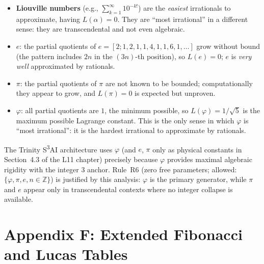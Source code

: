 \begin{itemize}
  \item
    \textbf{Liouville numbers} (e.g.,
    $\sum_{k=1}^{\infty} 10^{-k!}$) are the
    \emph{easiest} irrationals to approximate,
    having $L(\alpha) = 0$.
    They are ``most irrational'' in a different
    sense: they are transcendental and not even
    algebraic.
  \item
    \textbf{$e$}: the partial quotients of
    $e = [2; 1, 2, 1, 1, 4, 1, 1, 6, 1, \ldots]$
    grow without bound (the pattern includes $2n$
    in the $(3n)$-th position), so $L(e) = 0$;
    $e$ is \emph{very well} approximated by rationals.
  \item
    \textbf{$\pi$}: the partial quotients of $\pi$
    are not known to be bounded; computationally they
    appear to grow, and $L(\pi) = 0$ is expected
    but unproven.
  \item
    \textbf{$\varphi$}: all partial quotients are $1$,
    the minimum possible, so $L(\varphi) = 1/\sqrt{5}$
    is the maximum possible Lagrange constant.
    This is the only sense in which $\varphi$ is
    ``most irrational'': it is the hardest irrational
    to approximate by rationals.
\end{itemize}

The Trinity S\textsuperscript{3}AI architecture uses
$\varphi$ (and $e$, $\pi$ only as physical constants
in Section~4.3 of the L11 chapter) precisely because
$\varphi$ provides maximal algebraic rigidity with
the integer $3$ anchor.
Rule~R6 (zero free parameters; allowed: $\{\varphi, \pi, e, n \in \mathbb{Z}\}$)
is justified by this analysis: $\varphi$ is the
primary generator, while $\pi$ and $e$ appear only
in transcendental contexts where no integer collapse
is available.

\section{Appendix F: Extended Fibonacci and Lucas Tables}
\label{sec:gc-appendix-tables}


